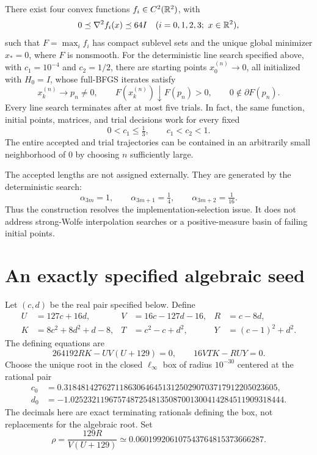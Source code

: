 \begin{theorem}\label{D:main}
There exist four convex functions $f_i\in C^2(\mathbb R^2)$, with
\[
 0\preceq\nabla^2 f_i(x)\preceq64I \quad(i=0,1,2,3;\ x\in\mathbb R^2),
\]
such that $F=\max_i f_i$ has compact sublevel sets and the unique global minimizer $x_*=0$, where $F$ is nonsmooth. For the deterministic line search specified above, with $c_1=10^{-4}$ and $c_2=1/2$, there are starting points $x_0^{(n)}\to0$, all initialized with $H_0=I$, whose full-BFGS iterates satisfy
\[
 x_k^{(n)}\longrightarrow p_n\ne0,\qquad
 F(x_k^{(n)})\downarrow F(p_n)>0,\qquad 0\notin\partial F(p_n).
\]
Every line search terminates after at most five trials. In fact, the same function, initial points, matrices, and trial decisions work for every fixed
\[
 0<c_1\le\tfrac13,\qquad c_1<c_2<1.
\]
The entire accepted and trial trajectories can be contained in an arbitrarily small neighborhood of $0$ by choosing $n$ sufficiently large.
\end{theorem}

The accepted lengths are not assigned externally. They are generated by the deterministic search:
\[
 \boxed{\alpha_{3m}=1,\qquad\alpha_{3m+1}=\tfrac14,\qquad\alpha_{3m+2}=\tfrac1{16}.}
\]
Thus the construction resolves the implementation-selection issue. It does not address strong-Wolfe interpolation searches or a positive-measure basin of failing initial points.


\setcounter{section}{1}
\setcounter{theorem}{1}
\setcounter{lemma}{0}
\setcounter{corollary}{0}
\setcounter{proposition}{0}
\setcounter{remark}{0}
\setcounter{equation}{1}


\section{An exactly specified algebraic seed}

Let $(c,d)$ be the real pair specified below. Define
\begin{align*}
 U&=127c+16d,& V&=16c-127d-16,& R&=c-8d,\\
 K&=8c^2+8d^2+d-8,& T&=c^2-c+d^2,& Y&=(c-1)^2+d^2.
\end{align*}
The defining equations are
\begin{equation}\label{D:polys}
 \boxed{264192RK-U V(U+129)=0,\qquad16VTK-RUY=0.}
\end{equation}
Choose the unique root in the closed $\ell_\infty$ box of radius $10^{-30}$ centered at the rational pair
\begin{align*}
 c_0&=0.31848142762711863064645131250290703717912205023605,\\
 d_0&=-1.02523211967574872548135087001300414284511909318444.
\end{align*}
The decimals here are exact terminating rationals defining the box, not replacements for the algebraic root. Set
\begin{equation}\label{D:rho}
 \rho=\frac{129R}{V(U+129)}
       \simeq0.060199206107543764815373666287.
\end{equation}

